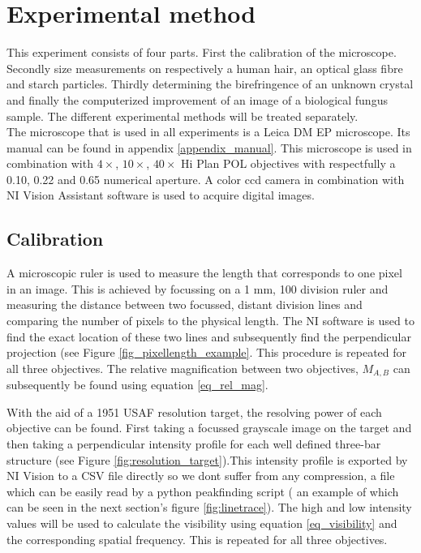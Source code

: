 \section{Experimental method}

This experiment consists of four parts. First the calibration of the microscope. Secondly size measurements on respectively a human hair, an optical glass fibre and starch particles. Thirdly determining the birefringence of an unknown crystal and finally the computerized improvement of an image of a biological fungus sample. The different experimental methods will be treated separately.\\

The microscope that is used in all experiments is a Leica DM EP microscope. Its manual can be found in appendix \ref{appendix_manual}. This microscope is used in combination with $4\times$, $10\times$, $40\times$ Hi Plan POL objectives with respectfully a 0.10, 0.22 and 0.65 numerical aperture. A color ccd camera in combination with NI Vision Assistant software is used to acquire digital images.\\

\subsection{Calibration}
A microscopic ruler is used to measure the length that corresponds to one pixel in an image. This is achieved by focussing on a 1 mm, 100 division ruler and measuring the distance between two focussed, distant division lines and comparing the number of pixels to the physical length. The NI software is used to find the exact location of these two lines and subsequently find the perpendicular projection (see Figure \ref{fig_pixellength_example}. This procedure is repeated for all three objectives. The relative magnification between two objectives, $M_{A,B}$ can subsequently be found using equation \ref{eq_rel_mag}.

\bigskip

With the aid of a 1951 USAF resolution target, the resolving power of each objective can be found. First taking a focussed grayscale image  on the target and then taking a perpendicular intensity profile for each well defined three-bar structure (see Figure \ref{fig:resolution_target}).This intensity profile is exported by NI Vision to a CSV file directly so we dont suffer from any compression, a file which can be easily read by a python peakfinding script ( an example of which can be seen in the next section's figure \ref{fig:linetrace}). The high and low intensity values will be used to calculate the visibility using equation \ref{eq_visibility} and the corresponding spatial frequency. This is repeated for all three objectives.\\

